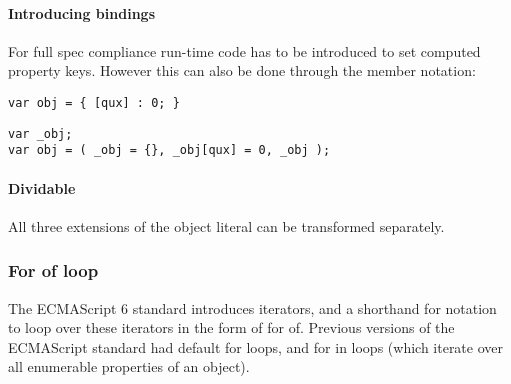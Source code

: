 \documentclass[10pt,a4paper]{article}
\begin{document}
\paragraph{Introducing bindings}
For full spec compliance run-time code has to be introduced to set computed property keys. However this can also be done through the member notation:

\begin{lstlisting}
var obj = { [qux] : 0; }
\end{lstlisting}

\begin{lstlisting}
var _obj;
var obj = ( _obj = {}, _obj[qux] = 0, _obj );
\end{lstlisting}  

\paragraph{Dividable}
All three extensions of the object literal can be transformed separately. 

\subsubsection{For of loop}
The ECMAScript 6 standard introduces iterators, and a shorthand for notation to loop over these iterators in the form of for of\cite[13.6.4]{SpecJS}. Previous versions of the ECMAScript standard had default for loops, and for in loops (which iterate over all enumerable properties of an object).
\end{document}
